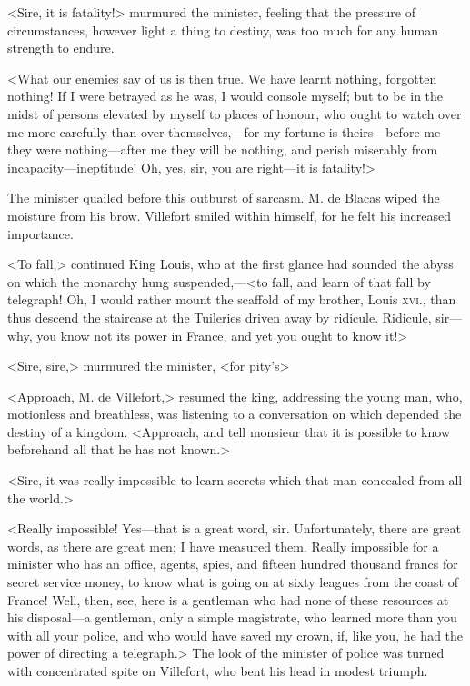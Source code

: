  <Sire, it is fatality!> murmured the minister, feeling that the pressure of circumstances, however light a thing to destiny, was too much for any human strength to endure. 

 <What our enemies say of us is then true. We have learnt nothing, forgotten nothing! If I were betrayed as he was, I would console myself; but to be in the midst of persons elevated by myself to places of honour, who ought to watch over me more carefully than over themselves,—for my fortune is theirs—before me they were nothing—after me they will be nothing, and perish miserably from incapacity—ineptitude! Oh, yes, sir, you are right—it is fatality!> 

 The minister quailed before this outburst of sarcasm. M. de Blacas wiped the moisture from his brow. Villefort smiled within himself, for he felt his increased importance. 

 <To fall,> continued King Louis, who at the first glance had sounded the abyss on which the monarchy hung suspended,—<to fall, and learn of that fall by telegraph! Oh, I would rather mount the scaffold of my brother, Louis \textsc{xvi.}, than thus descend the staircase at the Tuileries driven away by ridicule. Ridicule, sir—why, you know not its power in France, and yet you ought to know it!> 

 <Sire, sire,> murmured the minister, <for pity's\longdash> 

 <Approach, M. de Villefort,> resumed the king, addressing the young man, who, motionless and breathless, was listening to a conversation on which depended the destiny of a kingdom. <Approach, and tell monsieur that it is possible to know beforehand all that he has not known.> 

 <Sire, it was really impossible to learn secrets which that man concealed from all the world.> 

 <Really impossible! Yes—that is a great word, sir. Unfortunately, there are great words, as there are great men; I have measured them. Really impossible for a minister who has an office, agents, spies, and fifteen hundred thousand francs for secret service money, to know what is going on at sixty leagues from the coast of France! Well, then, see, here is a gentleman who had none of these resources at his disposal—a gentleman, only a simple magistrate, who learned more than you with all your police, and who would have saved my crown, if, like you, he had the power of directing a telegraph.> The look of the minister of police was turned with concentrated spite on Villefort, who bent his head in modest triumph. 

